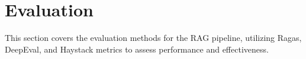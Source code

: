 \documentclass[letterpaper,10pt,english,openany,oneside]{sphinxmanual}
\begin{document}
\sphinxstepscope


\chapter{Evaluation}
\label{\detokenize{evaluation:evaluation}}\label{\detokenize{evaluation::doc}}
\sphinxAtStartPar
This section covers the evaluation methods for the RAG pipeline, utilizing Ragas, DeepEval, and Haystack metrics to assess performance and effectiveness.
\label{\detokenize{evaluation:module-tools.pipeline}}
\end{document}
